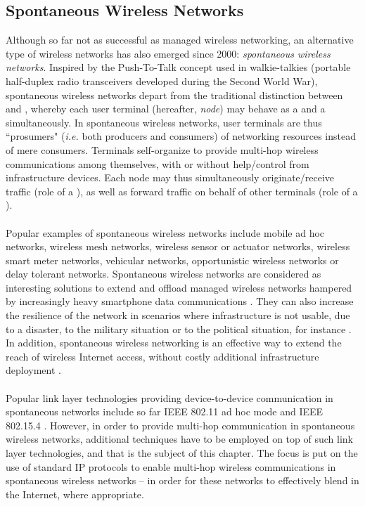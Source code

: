 \subsection{Spontaneous Wireless Networks}
\label{ss:spontaneous}
%
Although so far not as successful as managed wireless networking, an alternative type of wireless networks has also emerged since 2000: \emph{spontaneous wireless networks}. Inspired by the Push-To-Talk concept used in walkie-talkies (portable half-duplex radio transceivers developed during the Second World War), spontaneous wireless networks depart from the traditional distinction between  and , whereby each user terminal (hereafter, {\em node}) may behave as a  and a  simultaneously. In spontaneous wireless networks, user terminals are thus ``prosumers" ({\em i.e.} both producers and consumers) of networking resources instead of mere consumers. Terminals self-organize to provide multi-hop wireless communications among themselves, with or without help/control from infrastructure devices. Each node may thus simultaneously originate/receive traffic (role of a ), as well as forward traffic on behalf of other terminals (role of a ). \ \\ \ \\ 
%
Popular examples of spontaneous wireless networks include mobile ad hoc networks, wireless mesh networks, wireless sensor or actuator networks, wireless smart meter networks, vehicular networks, opportunistic wireless networks or delay tolerant networks. Spontaneous wireless networks are considered as interesting solutions to extend and offload managed wireless networks hampered by increasingly heavy smartphone data communications \cite{NY-TIMES}. They can also increase the resilience of the network in scenarios where infrastructure is not usable, due to a disaster, to the military situation or to the political situation, for instance \cite{COMMOTION}. In addition, spontaneous wireless networking is an effective way to extend the reach of wireless Internet access, without costly additional infrastructure deployment \cite{OLPC}. \ \\ \ \\ 
%
Popular link layer technologies providing device-to-device communication in spontaneous networks include so far IEEE 802.11 ad hoc mode \cite{IEEE-802-11} and IEEE 802.15.4 \cite{IEEE-802-15.4}. However, in order to provide multi-hop communication in spontaneous wireless networks, additional techniques have to be employed on top of such link layer technologies, and that is the subject of this chapter. The focus is put on the use of standard IP protocols to enable multi-hop wireless communications in spontaneous wireless networks -- in order for these networks to effectively blend in the Internet, where appropriate.%
%
